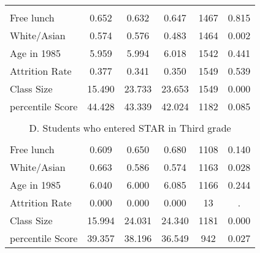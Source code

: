 \documentclass{article}
\begin{document}
\begin{table}[htbp]
\begin{tabular}{llccccc}
    \multicolumn{2}{c}{} &       &       &       &       &  \\
    \multicolumn{2}{l}{Free lunch} & 0.652  & 0.632  & 0.647  & 1467  & 0.815  \\
    \multicolumn{2}{l}{White/Asian} & 0.574  & 0.576  & 0.483  & 1464  & 0.002  \\
    \multicolumn{2}{l}{Age in 1985} & 5.959  & 5.994  & 6.018  & 1542  & 0.441  \\
    \multicolumn{2}{l}{Attrition Rate} & 0.377  & 0.341  & 0.350  & 1549  & 0.539  \\
    \multicolumn{2}{l}{Class Size} & 15.490  & 23.733  & 23.653  & 1549  & 0.000  \\
    \multicolumn{2}{l}{percentile Score} & 44.428  & 43.339  & 42.024  & 1182  & 0.085  \\
          &       &       &       &       &       &  \\
    \multicolumn{7}{c}{D. Students who entered STAR in Third grade} \\
    \multicolumn{2}{c}{} &       &       &       &       &  \\
    \multicolumn{2}{l}{Free lunch} & 0.609  & 0.650  & 0.680  & 1108  & 0.140  \\
    \multicolumn{2}{l}{White/Asian} & 0.663  & 0.586  & 0.574  & 1163  & 0.028  \\
    \multicolumn{2}{l}{Age in 1985} & 6.040  & 6.000  & 6.085  & 1166  & 0.244  \\
    \multicolumn{2}{l}{Attrition Rate} & 0.000  & 0.000  & 0.000  & 13    & . \\
    \multicolumn{2}{l}{Class Size} & 15.994  & 24.031  & 24.340  & 1181  & 0.000  \\
    \multicolumn{2}{l}{percentile Score} & 39.357  & 38.196  & 36.549  & 942   & 0.027  \\
    \bottomrule
    \bottomrule
    \end{tabular}%
  \label{tab:addlabel}%
\end{table}%



\end{document}
